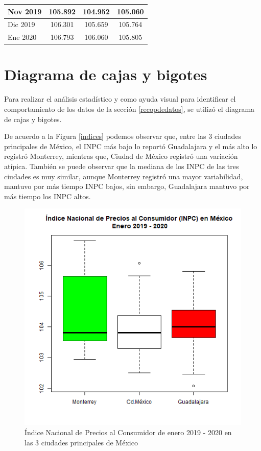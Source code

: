 \documentclass[fontsize=12pt]{article}
\begin{document}
\begin{table}[htp]
\begin{tabular}{|l|c|c|c|}
Nov 2019                             & 105.892            & 104.952                                                                                  & 105.060              \\ \hline
Dic 2019                             & 106.301            & 105.659                                                                                  & 105.764              \\ \hline
Ene 2020                             & 106.793            & 106.060                                                                                  & 105.805              \\ \hline
\end{tabular}
\end{table}


\section{Diagrama de cajas y bigotes}
Para realizar el análisis estadístico y como ayuda visual para identificar el comportamiento de los datos de la sección \ref{recopdedatos}, se utilizó el diagrama de cajas y bigotes. 

De acuerdo a la Figura \ref{indices} podemos observar que, entre las 3 ciudades principales de México, el INPC más bajo lo reportó Guadalajara y el más alto lo registró Monterrey, mientras que, Ciudad de México registró una variación atípica. También se puede observar que la mediana de los INPC de las tres ciudades es muy similar, aunque Monterrey registró una mayor variabilidad, mantuvo por más tiempo INPC bajos, sin embargo, Guadalajara mantuvo por más tiempo los INPC altos.


\begin{figure}[htp]
\centering
\includegraphics[scale=0.8]{PrincipalesCiudades}
\caption{Índice Nacional de Precios al Consumidor de enero 2019 - 2020 en las 3 ciudades principales de México}
\label{PrincipalesCiudades}
\end{figure}
\end{document}
